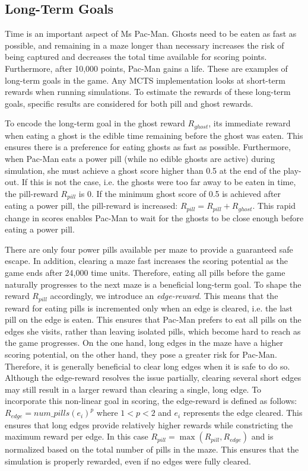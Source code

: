 \documentclass[journal]{IEEEtran}
\begin{document}
\subsection{Long-Term Goals}
\label{longterm}
Time is an important aspect of Ms Pac-Man. Ghosts need to be eaten as fast as possible, and remaining in a maze longer than necessary increases the risk of being captured and decreases the total time available for scoring points. Furthermore, after 10,000 points, Pac-Man gains a life. These are examples of long-term goals in the game. Any MCTS implementation looks at short-term rewards when running simulations. To estimate the rewards of these long-term goals, specific results are considered for both pill and ghost rewards.

To encode the long-term goal in the ghost reward $R_{ghost}$, its immediate reward when eating a ghost is the edible time remaining before the ghost was eaten. This ensures there is a preference for eating ghosts as fast as possible. Furthermore, when Pac-Man eats a power pill (while no edible ghosts are active) during simulation, she must achieve a ghost score higher than 0.5 at the end of the play-out. If this is not the case, i.e. the ghosts were too far away to be eaten in time, the pill-reward $R_{pill}$ is 0. If the minimum ghost score of 0.5 is achieved after eating a power pill, the pill-reward is increased: $R_{pill} = R_{pill} + R_{ghost}$. This rapid change in scores enables Pac-Man to wait for the ghosts to be close enough before eating a power pill.

There are only four power pills available per maze to provide a guaranteed safe escape. In addition, clearing a maze fast increases the scoring potential as the game ends after 24,000 time units. Therefore, eating all pills before the game naturally progresses to the next maze is a beneficial long-term goal. To shape the reward $R_{pill}$ accordingly, we introduce an \emph{edge-reward}. This means that the reward for eating pills is incremented only when an edge is cleared, i.e. the last pill on the edge is eaten. This ensures that Pac-Man prefers to eat all pills on the edges she visits, rather than leaving isolated pills, which become hard to reach as the game progresses. On the one hand, long edges in the maze have a higher scoring potential, on the other hand, they pose a greater risk for Pac-Man. Therefore, it is generally beneficial to clear long edges when it is safe to do so. Although the edge-reward resolves the issue partially, clearing several short edges may still result in a larger reward than clearing a single, long edge. To incorporate this non-linear goal in scoring, the edge-reward is defined as follows: $R_{edge} = {num\_pills(e_i)}^{p}$ where $1 < p < 2$ and $e_i$ represents the edge cleared. This ensures that long edges provide relatively higher rewards while constricting the maximum reward per edge. In this case $R_{pill} = \max(R_{pill}, R_{edge})$ and is normalized based on the total number of pills in the maze. This ensures that the simulation is properly rewarded, even if no edges were fully cleared.
\end{document}
